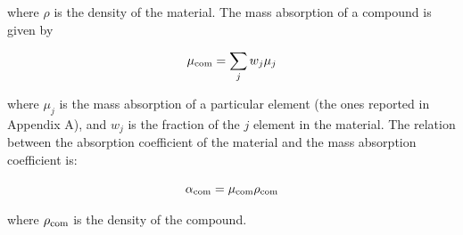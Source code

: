 \begin{flushleft}
where $\rho $ is the density of the material. The mass absorption of a compound is given by
\end{flushleft}

\begin{equation}
\mu \textsubscript{com} = \sum_{j} w_j \mu_j
\label{eq: mu_com}
\end{equation}

\begin{flushleft}
where $\mu_j$ is the mass absorption of a particular element (the ones reported in Appendix A), and $w_j $ is the fraction of the $j $ element in the material. The relation between the absorption coefficient of the material and the mass absorption coefficient is:
\end{flushleft}

\begin{equation}
\alpha \textsubscript{com} = \mu \textsubscript{com} \rho \textsubscript{com}
\label{eq: alpha com}
\end{equation}

\begin{flushleft}
where $\rho \textsubscript{com}$ is the density of the compound.
\end{flushleft}

